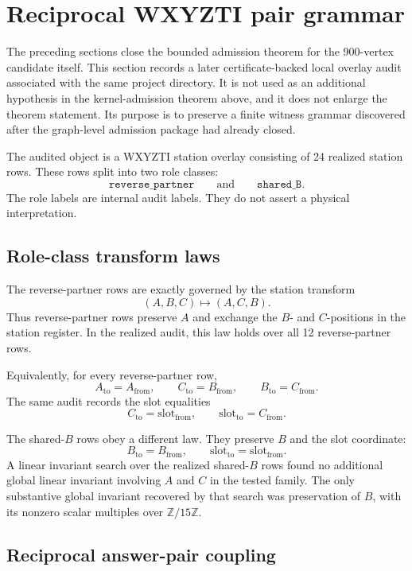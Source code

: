 \section{Reciprocal WXYZTI pair grammar}

The preceding sections close the bounded admission theorem for the 900-vertex candidate itself. This section records a later certificate-backed local overlay audit associated with the same project directory. It is not used as an additional hypothesis in the kernel-admission theorem above, and it does not enlarge the theorem statement. Its purpose is to preserve a finite witness grammar discovered after the graph-level admission package had already closed.

The audited object is a WXYZTI station overlay consisting of 24 realized station rows. These rows split into two role classes:
\[
\texttt{reverse\_partner}
\qquad\text{and}\qquad
\texttt{shared\_B}.
\]
The role labels are internal audit labels. They do not assert a physical interpretation.

\subsection{Role-class transform laws}

The reverse-partner rows are exactly governed by the station transform
\[
(A,B,C)\longmapsto (A,C,B).
\]
Thus reverse-partner rows preserve \(A\) and exchange the \(B\)- and \(C\)-positions in the station register. In the realized audit, this law holds over all 12 reverse-partner rows.

Equivalently, for every reverse-partner row,
\[
A_{\mathrm{to}}=A_{\mathrm{from}},
\qquad
C_{\mathrm{to}}=B_{\mathrm{from}},
\qquad
B_{\mathrm{to}}=C_{\mathrm{from}}.
\]
The same audit records the slot equalities
\[
C_{\mathrm{to}}=\mathrm{slot}_{\mathrm{from}},
\qquad
\mathrm{slot}_{\mathrm{to}}=C_{\mathrm{from}}.
\]

The shared-\(B\) rows obey a different law. They preserve \(B\) and the slot coordinate:
\[
B_{\mathrm{to}}=B_{\mathrm{from}},
\qquad
\mathrm{slot}_{\mathrm{to}}=\mathrm{slot}_{\mathrm{from}}.
\]
A linear invariant search over the realized shared-\(B\) rows found no additional global linear invariant involving \(A\) and \(C\) in the tested family. The only substantive global invariant recovered by that search was preservation of \(B\), with its nonzero scalar multiples over \(\mathbb{Z}/15\mathbb{Z}\).

\subsection{Reciprocal answer-pair coupling}

